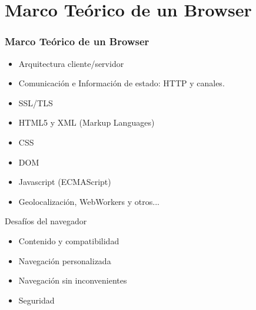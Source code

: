 \documentclass[serif,9pt]{beamer}
\begin{document}

\section{Marco Te\'orico de un Browser}
\begin{frame}
	\frametitle{Marco Te\'orico de un Browser}
	\begin{itemize}
		\item Arquitectura cliente/servidor
		\item Comunicaci\'on e Informaci\'on de estado: HTTP y canales.
		\item SSL/TLS
		\item HTML5 y XML (Markup Languages)
		\item CSS
		\item DOM
		\item Javascript (ECMAScript)
		\item Geolocalizaci\'on, WebWorkers y otros...
	\end{itemize}
	\begin{block}{Desaf\'ios del navegador}
		\begin{itemize}
			\item Contenido y compatibilidad
			\item Navegaci\'on personalizada
			\item Navegaci\'on sin inconvenientes
			\item Seguridad
		\end{itemize}
	\end{block}
\end{frame}
\end{document}
